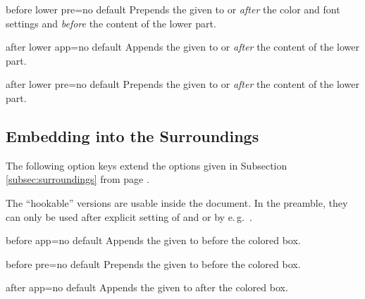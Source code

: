 \begin{docTcbKey}{before lower pre}{=}{no default}
  Prepends the given  to  or  \emph{after} the color and font settings
  and \emph{before} the content of the lower part.
\end{docTcbKey}

\begin{docTcbKey}{after lower app}{=}{no default}
  Appends the given  to  or  \emph{after} the content of the lower part.
\end{docTcbKey}

\begin{docTcbKey}{after lower pre}{=}{no default}
  Prepends the given  to  or  \emph{after} the content of the lower part.
\end{docTcbKey}


\subsection{Embedding into the Surroundings}
The following option keys extend the options given in Subsection \ref{subsec:surroundings}
from page \pageref{subsec:surroundings}.

\begin{marker}
The \enquote{hookable} versions are usable inside the document.
In the preamble, they can only be used after explicit setting of
 and  or by e.\,g.\ .
\end{marker}

\begin{docTcbKey}{before app}{=}{no default}
  Appends the given  to  before the colored box.
\end{docTcbKey}

\begin{docTcbKey}{before pre}{=}{no default}
  Prepends the given  to  before the colored box.
\end{docTcbKey}

\begin{docTcbKey}{after app}{=}{no default}
  Appends the given  to  after the colored box.
\end{docTcbKey}


